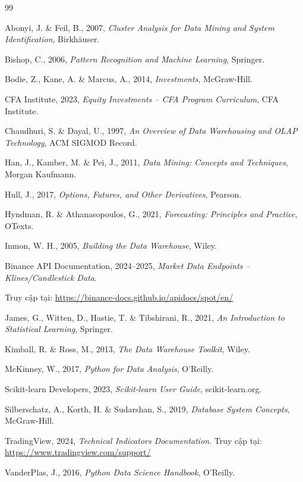 \begin{thebibliography}{99}

Abonyi, J. \& Feil, B., 2007, \textit{Cluster Analysis for Data Mining and System Identification}, Birkhäuser.

Bishop, C., 2006, \textit{Pattern Recognition and Machine Learning}, Springer.

Bodie, Z., Kane, A. \& Marcus, A., 2014, \textit{Investments}, McGraw-Hill.

CFA Institute, 2023, \textit{Equity Investments – CFA Program Curriculum}, CFA Institute.

Chaudhuri, S. \& Dayal, U., 1997, \textit{An Overview of Data Warehousing and OLAP Technology}, ACM SIGMOD Record.

Han, J., Kamber, M. \& Pei, J., 2011, \textit{Data Mining: Concepts and Techniques}, Morgan Kaufmann.

Hull, J., 2017, \textit{Options, Futures, and Other Derivatives}, Pearson.

Hyndman, R. \& Athanasopoulos, G., 2021, \textit{Forecasting: Principles and Practice}, OTexts.

Inmon, W. H., 2005, \textit{Building the Data Warehouse}, Wiley.

Binance API Documentation, 2024--2025, \textit{Market Data Endpoints -- Klines/Candlestick Data}. 

Truy cập tại: \url{https://binance-docs.github.io/apidocs/spot/en/}

James, G., Witten, D., Hastie, T. \& Tibshirani, R., 2021, \textit{An Introduction to Statistical Learning}, Springer.

Kimball, R. \& Ross, M., 2013, \textit{The Data Warehouse Toolkit}, Wiley.

McKinney, W., 2017, \textit{Python for Data Analysis}, O’Reilly.

Scikit-learn Developers, 2023, \textit{Scikit-learn User Guide}, scikit-learn.org.

Silberschatz, A., Korth, H. \& Sudarshan, S., 2019, \textit{Database System Concepts}, McGraw-Hill.

TradingView, 2024, \textit{Technical Indicators Documentation}. Truy cập tại: \url{https://www.tradingview.com/support/}

VanderPlas, J., 2016, \textit{Python Data Science Handbook}, O’Reilly.

\end{thebibliography}
